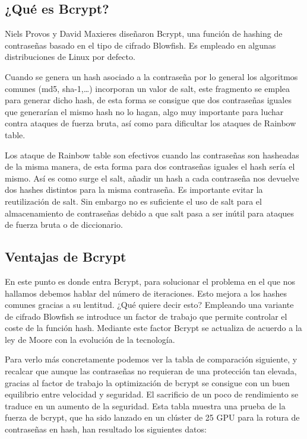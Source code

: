 \subsection{¿Qué es Bcrypt?}
Niels Provos y David Maxieres diseñaron Bcrypt, una función de hashing de contraseñas basado en el tipo de cifrado Blowfish. Es empleado en algunas distribuciones de Linux por defecto. 


Cuando se genera un hash asociado a la contraseña por lo general los algoritmos comunes (md5, sha-1,…) incorporan un valor de salt, este fragmento se emplea para generar dicho hash, de esta forma se consigue que dos contraseñas iguales que generarían el mismo hash no lo hagan, algo muy importante para luchar contra ataques de fuerza bruta, así como para dificultar los ataques de Rainbow table.


Los ataque de Rainbow table son efectivos cuando las contraseñas son hasheadas de la misma manera, de esta forma para dos contraseñas iguales el hash sería el mismo. Así es como surge el salt, añadir un hash a cada contraseña nos devuelve dos hashes distintos para la misma contraseña. Es importante evitar la reutilización de salt. Sin embargo no es suficiente el uso de salt para el almacenamiento de contraseñas debido a que salt pasa a ser inútil para ataques de fuerza bruta o de diccionario.


\subsection{Ventajas de Bcrypt}
En este punto es donde entra Bcrypt, para solucionar el problema en el que nos hallamos debemos hablar del número de iteraciones. Esto mejora a los hashes comunes gracias a su lentitud. ¿Qué quiere decir esto? Empleando una variante de cifrado Blowfish se introduce un factor de trabajo que permite controlar el coste de la función hash. Mediante este factor Bcrypt se actualiza de acuerdo a la ley de Moore con la evolución de la tecnología.


Para verlo más concretamente podemos ver la tabla de comparación siguiente, y recalcar que aunque las contraseñas no requieran de una protección tan elevada, gracias al factor de trabajo la optimización de bcrypt se consigue con un buen equilibrio entre velocidad y seguridad. El sacrificio de un poco de rendimiento se traduce en un aumento de la seguridad. 
Esta tabla muestra una prueba de la fuerza de bcrypt, que ha sido lanzado en un clúster de 25 GPU para la rotura de contraseñas en hash, han resultado los siguientes datos:


